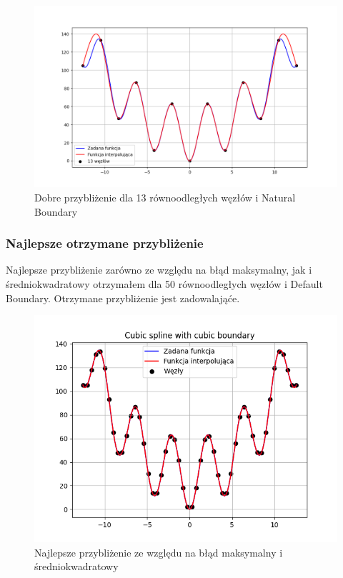 \documentclass{article}
\begin{document}
\begin{figure}[H]
\centering
  \begin{minipage}[b]{0.49\textwidth}
    \includegraphics[width=\textwidth]{img24_n=13.png}
    \caption{Dobre przybliżenie dla 13 równoodległych węzłów i Natural Boundary}
  \end{minipage}
\end{figure}

\subsubsection{Najlepsze otrzymane przybliżenie}

Najlepsze przybliżenie zarówno ze względu na błąd maksymalny, jak i średniokwadratowy otrzymałem dla 50 równoodległych węzłów i Default Boundary. Otrzymane przybliżenie jest zadowalająće.

\begin{figure}[H]
\centering
  \begin{minipage}[b]{0.49\textwidth}
    \includegraphics[width=\textwidth]{img25.png}
    \caption{Najlepsze przybliżenie ze względu na błąd maksymalny i średniokwadratowy}
  \end{minipage}
\end{figure}
\end{document}
